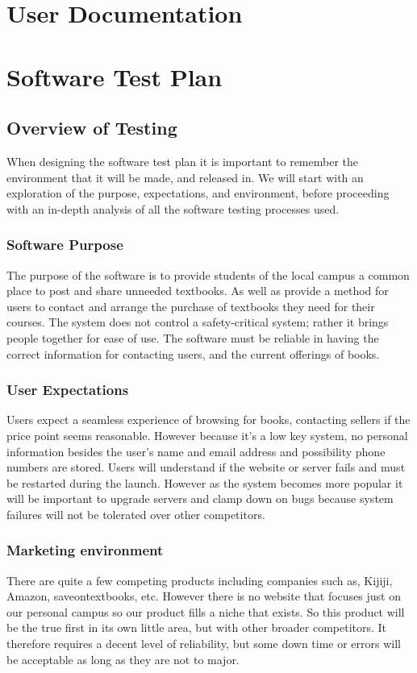 \documentclass[11pt]{article}
\begin{document}
\section{User Documentation}

\section{Software Test Plan}
	\subsection{Overview of Testing}
		When designing the software test plan it is important to remember the environment that it will be made, and released in.
		We will start with an exploration of the purpose, expectations, and environment, before proceeding with an in-depth analysis of all the software testing processes used.
		\subsubsection{Software Purpose}
			The purpose of the software is to provide students of the local campus a common place to post and share unneeded textbooks.
			As well as provide a method for users to contact and arrange the purchase of textbooks they need for their courses. 
			The system does not control a safety-critical system; rather it brings people together for ease of use. 
			The software must be reliable in having the correct information for contacting users, and the current offerings of books.
		\subsubsection{User Expectations}
			Users expect a seamless experience of browsing for books, contacting sellers if the price point seems reasonable.
			However because it's a low key system, no personal information besides the user's name and email address and possibility phone numbers are stored.
			Users will understand if the website or server fails and must be restarted during the launch.
			However as the system becomes more popular it will be important to upgrade servers and clamp down on bugs because system failures will not be tolerated over other competitors.

		\subsubsection{Marketing environment}
			There are quite a few competing products including companies such as, Kijiji, Amazon, saveontextbooks, etc.
			However there is no website that focuses just on our personal campus so our product fills a niche that exists.
			So this product will be the true first in its own little area, but with other broader competitors.
			It therefore requires a decent level of reliability, but some down time or errors will be acceptable as long as they are not to major.
\end{document}
